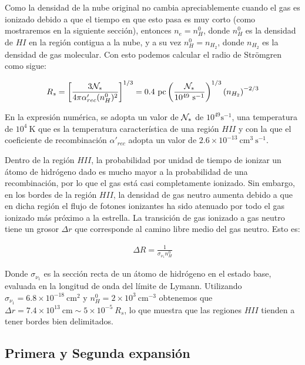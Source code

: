 Como la densidad de la nube original no cambia apreciablemente cuando el gas es ionizado debido a que el tiempo en que esto pasa es muy corto (como mostraremos en la siguiente sección), entonces $n_e = n^0_H$, donde $n^0_H$ es la densidad de $HI$ en la región contigua a la nube, y a su vez $n^0_H = n_{H_2}$, donde $n_{H_2}$ es la densidad de gas molecular. Con esto podemos calcular el radio de Strömgren como sigue:

\begin{align}
  R_s = \left[\frac{3\mathcal{N}_*}{4\pi\alpha'_{rec}(n^0_H)^2}\right]^{1/3} = 0.4\mathrm{~pc}\left(\frac{\mathcal{N}_*}{10^{49}\mathrm{~s^{-1}}}\right)^{1/3}\left(n_{H_2}\right)^{-2/3} \label{eq:stromgren}
\end{align}

En la expresión numérica, se adopta un valor de $\mathcal{N}_*$ de $10^{49}\mathrm{s^{-1}}$, una temperatura de $10^4\mathrm{~K}$ que es la temperatura característica de una región $HII$ y con la que el coeficiente de recombinación $\alpha'_{rec}$ adopta un valor de $2.6\times 10^{-13}\mathrm{~cm^3~s^{-1}}$.

Dentro de la región $HII$, la probabilidad por unidad de tiempo de ionizar un átomo de hidrógeno dado es mucho mayor a la probabilidad de una recombinación, por lo que el gas está casi completamente ionizado. Sin embargo, en los bordes de la región $HII$, la densidad de gas neutro aumenta debido a que en dicha región el flujo de fotones ionizantes ha sido atenuado por todo el gas ionizado más próximo a la estrella. La transición de gas ionizado a gas neutro tiene un grosor $\Delta r$ que corresponde al camino libre medio del gas neutro. Esto es:

\begin{align}
\Delta R = \frac{1}{\sigma_{\nu_1}n^0_H}  
\end{align}

Donde $\sigma_{\nu_1}$ es la sección recta de un átomo de hidrógeno en el estado base, evaluada en la longitud de onda del límite de Lymann. Utilizando $\sigma_{\nu_1} = 6.8\times 10^{-18}\mathrm{~cm^2}$ y $n^0_H = 2\times 10^{3}\mathrm{~cm^{-3}}$ obtenemos que $\Delta r = 7.4\times 10^{13}\mathrm{~cm} \sim 5\times 10^{-5}~R_s$, lo que muestra que las regiones $HII$ tienden a tener bordes bien delimitados.

\subsection{Primera y Segunda expansión}

